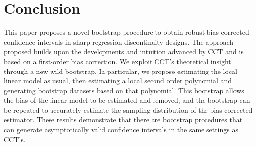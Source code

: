 \documentclass[12pt,fleqn]{article}
\begin{document}
\section{Conclusion}\label{conclusion}

This paper proposes a novel bootstrap procedure to obtain robust bias-corrected
confidence intervals in sharp regression discontinuity designs. The approach proposed builds upon the developments and intuition
advanced by CCT and is based on a first-order bias correction. We exploit CCT's
theoretical insight through a new wild bootstrap. In particular, we propose
estimating the local linear model as usual, then estimating a local second order
polynomial and generating bootstrap datasets based on that
polynomial. This bootstrap allows the bias of the linear model to be estimated
and removed, and the bootstrap can be repeated to accurately estimate the
sampling distribution of the bias-corrected estimator. These results demonstrate
that there are bootstrap procedures that can generate asymptotically valid
confidence intervals in the same settings as CCT's.

\appendix
\end{document}
